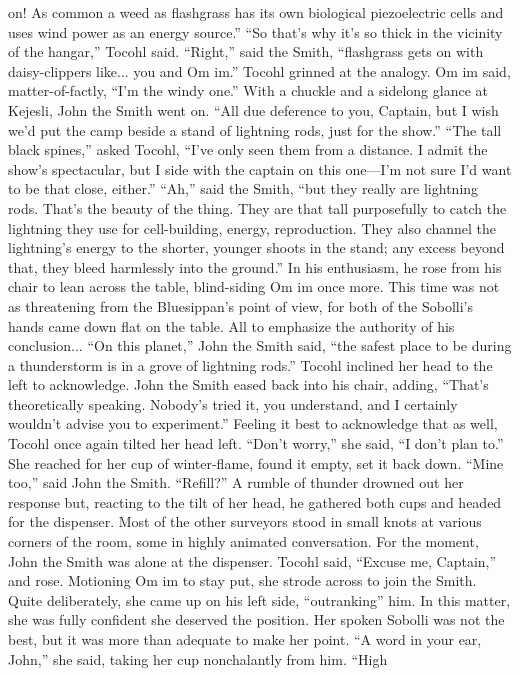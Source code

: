 \documentclass[9pt]{article}
\begin{document}
on! As common a weed as flashgrass has its own biological piezoelectric cells and uses wind power as
an energy source.”
“So that’s why it’s so thick in the vicinity of the hangar,” Tocohl said.
“Right,” said the Smith, “flashgrass gets on with daisy-clippers like... you and Om im.”
Tocohl grinned at the analogy. Om im said, matter-of-factly, “I’m the windy one.”
With a chuckle and a sidelong glance at Kejesli, John the Smith went on. “All due deference to you,
Captain, but I wish we’d put the camp beside a stand of lightning rods, just for the show.”
“The tall black spines,” asked Tocohl, “I’ve only seen them from a distance. I admit the show’s
spectacular, but I side with the captain on this one—I’m not sure I’d want to be that close, either.”
“Ah,” said the Smith, “but they really are lightning rods. That’s the beauty of the thing. They are that
tall purposefully to catch the lightning they use for cell-building, energy, reproduction. They also channel
the lightning’s energy to the shorter, younger shoots in the stand; any excess beyond that, they bleed
harmlessly into the ground.”
In his enthusiasm, he rose from his chair to lean across the table, blind-siding Om im once more. This
time was not as threatening from the Bluesippan’s point of view, for both of the Sobolli’s hands came
down flat on the table. All to emphasize the authority of his conclusion...
“On this planet,” John the Smith said, “the safest place to be during a thunderstorm is in a grove of
lightning rods.”
Tocohl inclined her head to the left to acknowledge. John the Smith eased back into his chair, adding,
“That’s theoretically speaking. Nobody’s tried it, you understand, and I certainly wouldn’t advise you to
experiment.”
Feeling it best to acknowledge that as well, Tocohl once again tilted her head left. “Don’t worry,” she
said, “I don’t plan to.” She reached for her cup of winter-flame, found it empty, set it back down.
“Mine too,” said John the Smith. “Refill?” A rumble of thunder drowned out her response but,
reacting to the tilt of her head, he gathered both cups and headed for the dispenser.
Most of the other surveyors stood in small knots at various corners of the room, some in highly
animated conversation. For the moment, John the Smith was alone at the dispenser. Tocohl said, “Excuse
me, Captain,” and rose. Motioning Om im to stay put, she strode across to join the Smith.
Quite deliberately, she came up on his left side, “outranking” him. In this matter, she was fully
confident she deserved the position. Her spoken Sobolli was not the best, but it was more than adequate
to make her point. “A word in your ear, John,” she said, taking her cup nonchalantly from him. “High
\end{document}
